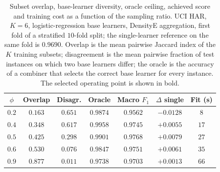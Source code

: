 \begin{table}[!t]
		\centering
		\caption{Subset overlap, base-learner diversity, oracle ceiling, achieved score and
		training cost as a function of the sampling ratio. UCI HAR, $K = 6$,
		logistic-regression base learners, DensityE aggregation, first fold of a stratified
		$10$-fold split; the single-learner reference on the same fold is $0.9690$. Overlap is
		the mean pairwise Jaccard index of the $K$ training subsets; disagreement is the mean
		pairwise fraction of test instances on which two base learners differ; the oracle is
		the accuracy of a combiner that selects the correct base learner for every instance.
		The selected operating point is shown in bold.}
		\label{tab:diversity_cost}
		\begin{tabular}{ccccccc}
			\hline
			$\phi$ & Overlap & Disagr. & Oracle & Macro $F_1$ & $\Delta$ single & Fit (s) \\
			\hline
			$0.2$ & $0.163$ & $0.651$ & $0.9874$ & $0.9562$ & $-0.0128$ & $8$ \\
			$0.4$ & $0.348$ & $0.617$ & $0.9958$ & $0.9745$ & $+0.0055$ & $17$ \\
			$0.5$ & $0.425$ & $0.298$ & $0.9901$ & $\mathbf{0.9768}$ & $+0.0079$ & $27$ \\
			$0.6$ & $0.530$ & $0.076$ & $0.9847$ & $0.9751$ & $+0.0061$ & $35$ \\
			$0.9$ & $0.877$ & $0.011$ & $0.9738$ & $0.9703$ & $+0.0013$ & $66$ \\
			\hline
		\end{tabular}
	\end{table}
